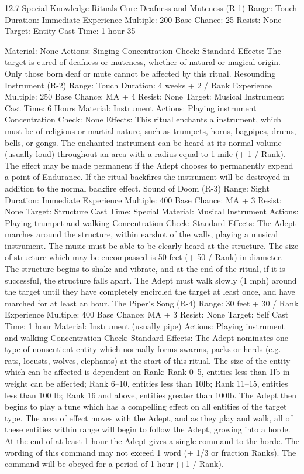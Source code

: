 \documentclass[a4paper]{article}
\begin{document}
\begin{multicols}{3}
12.7 Special Knowledge Rituals
Cure Deafness and Muteness (R-1)
Range: Touch
Duration: Immediate
Experience Multiple: 200
Base Chance: 25%
Resist: None
Target: Entity
Cast Time: 1 hour
35

Material: None
Actions: Singing
Concentration Check: Standard
Effects: The target is cured of deafness or muteness, whether of natural or magical origin. Only
those born deaf or mute cannot be affected by this
ritual.
Resounding Instrument (R-2)
Range: Touch
Duration: 4 weeks + 2 / Rank
Experience Multiple: 250
Base Chance: MA + 4%
Resist: None
Target: Musical Instrument
Cast Time: 6 Hours
Material: Instrument
Actions: Playing instrument
Concentration Check: None
Effects: This ritual enchants a instrument, which
must be of religious or martial nature, such as
trumpets, horns, bagpipes, drums, bells, or gongs.
The enchanted instrument can be heard at its normal volume (usually loud) throughout an area with
a radius equal to 1 mile (+ 1 / Rank). The effect
may be made permanent if the Adept chooses to
permanently expend a point of Endurance. If the
ritual backfires the instrument will be destroyed in
addition to the normal backfire effect.
Sound of Doom (R-3)
Range: Sight
Duration: Immediate
Experience Multiple: 400
Base Chance: MA + 3%
Resist: None
Target: Structure
Cast Time: Special
Material: Musical Instrument
Actions: Playing trumpet and walking
Concentration Check: Standard
Effects: The Adept marches around the structure,
within earshot of the walls, playing a musical instrument. The music must be able to be clearly
heard at the structure. The size of structure which
may be encompassed is 50 feet (+ 50 / Rank) in
diameter. The structure begins to shake and vibrate, and at the end of the ritual, if it is successful,
the structure falls apart. The Adept must walk
slowly (1 mph) around the target until they have
completely encircled the target at least once, and
have marched for at least an hour.
The Piper’s Song (R-4)
Range: 30 feet + 30 / Rank
Experience Multiple: 400
Base Chance: MA + 3%
Resist: None
Target: Self
Cast Time: 1 hour
Material: Instrument (usually pipe)
Actions: Playing instrument and walking
Concentration Check: Standard
Effects: The Adept nominates one type of nonsentient entity which normally forms swarms,
packs or herds (e.g. rats, locusts, wolves, elephants) at the start of this ritual. The size of the
entity which can be affected is dependent on Rank:
Rank 0–5, entities less than 1lb in weight can be
affected; Rank 6–10, entities less than 10lb; Rank
11–15, entities less than 100 lb; Rank 16 and
above, entities greater than 100lb. The Adept then
begins to play a tune which has a compelling effect
on all entities of the target type. The area of effect
moves with the Adept, and as they play and walk,
all of these entities within range will begin to follow the Adept, growing into a horde. At the end of
at least 1 hour the Adept gives a single command
to the horde. The wording of this command may
not exceed 1 word (+ 1/3 or fraction Ranks). The
command will be obeyed for a period of 1 hour (+1
/ Rank).


\end{multicols}
\end{document}
